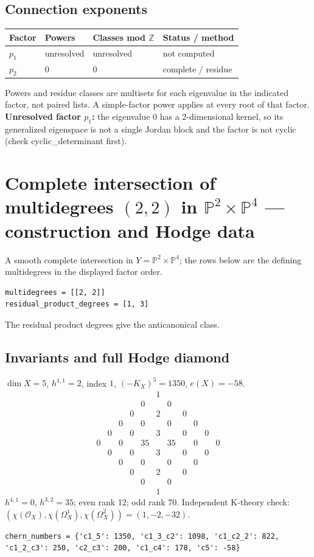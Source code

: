 \documentclass[10pt,a4paper]{article}
\begin{document}
\subsection*{Connection exponents}
\begin{center}\begin{tabular}{llll}\toprule Factor & Powers & Classes mod $\mathbb Z$ & Status / method\\\midrule
$p_{1}$ & unresolved & unresolved & not computed\\
$p_{2}$ & $0$ & $0$ & complete / residue\\
\bottomrule\end{tabular}\end{center}
Powers and residue classes are multisets for each eigenvalue in the indicated factor, not paired lists. A simple-factor power applies at every root of that factor.
\textbf{Unresolved factor $p_{1}$:} the eigenvalue 0 has a 2-dimensional kernel, so its generalized eigenspace is not a single Jordan block and the factor is not cyclic (check cyclic\_determinant first).
\clearpage\section*{Complete intersection of multidegrees $(2,2)$ in $\mathbb P^{2}\times \mathbb P^{4}$ --- construction and Hodge data}\label{entry:PROD5-A01}
A smooth complete intersection in $Y=\mathbb P^{2}\times\mathbb P^{4}$; the rows below are the defining multidegrees in the displayed factor order.
\begin{lstlisting}
multidegrees = [[2, 2]]
residual_product_degrees = [1, 3]
\end{lstlisting}
The residual product degrees give the anticanonical class.
\subsection*{Invariants and full Hodge diamond}
$\dim X=5$, $h^{1,1}=2$, index $1$, $(-K_X)^5=1350$, $e(X)=-58$.
\[\begin{array}{ccccccccccc}&&&&&1&&&&&\\&&&&0&&0&&&&\\&&&0&&2&&0&&&\\&&0&&0&&0&&0&&\\&0&&0&&3&&0&&0&\\0&&0&&35&&35&&0&&0\\&0&&0&&3&&0&&0&\\&&0&&0&&0&&0&&\\&&&0&&2&&0&&&\\&&&&0&&0&&&&\\&&&&&1&&&&&\end{array}\]
$h^{4,1}=0$, $h^{3,2}=35$; even rank 12; odd rank 70.
Independent K-theory check: $(\chi(\mathcal O_X),\chi(\Omega_X^1),\chi(\Omega_X^2))=(1, -2, -32)$.
\begin{lstlisting}
chern_numbers = {'c1_5': 1350, 'c1_3_c2': 1098, 'c1_c2_2': 822, 'c1_2_c3': 250, 'c2_c3': 200, 'c1_c4': 178, 'c5': -58}
\end{lstlisting}
\end{document}
